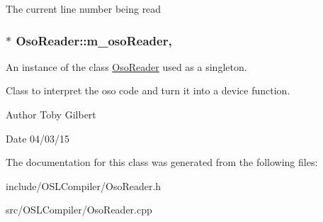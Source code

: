 The current line number being read \hypertarget{class_oso_reader_ad2bd03b85104e4ed4badb2ee5f93d959}{
\subsubsection[{m\-\_\-oso\-Reader}]{ $\ast$ Oso\-Reader\-::m\-\_\-oso\-Reader\hspace{0.3cm}{\ttfamily [static]}, {\ttfamily [private]}}}\label{class_oso_reader_ad2bd03b85104e4ed4badb2ee5f93d959}


An instance of the class \hyperlink{class_oso_reader}{Oso\-Reader} used as a singleton. 

Class to interpret the oso code and turn it into a device function.

\begin{DoxyAuthor}{Author}
Toby Gilbert 
\end{DoxyAuthor}
\begin{DoxyDate}{Date}
04/03/15 
\end{DoxyDate}


The documentation for this class was generated from the following files\-:\begin{DoxyCompactItemize}
\item 
include/\-O\-S\-L\-Compiler/Oso\-Reader.\-h\item 
src/\-O\-S\-L\-Compiler/Oso\-Reader.\-cpp\end{DoxyCompactItemize}
